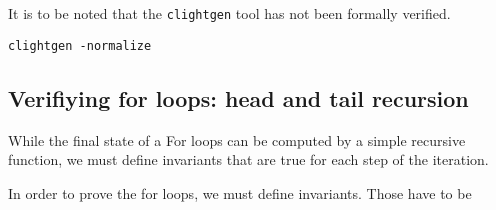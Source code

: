 It is to be noted that the \texttt{clightgen} tool has not been formally verified.

\texttt{clightgen -normalize}

\subsection{Verifiying for loops: head and tail recursion}

While the final state of a For loops can be computed by a simple recursive function,
we must define invariants that are true for each step of the iteration.



In order to prove the for loops, we must define invariants.
Those have to be
